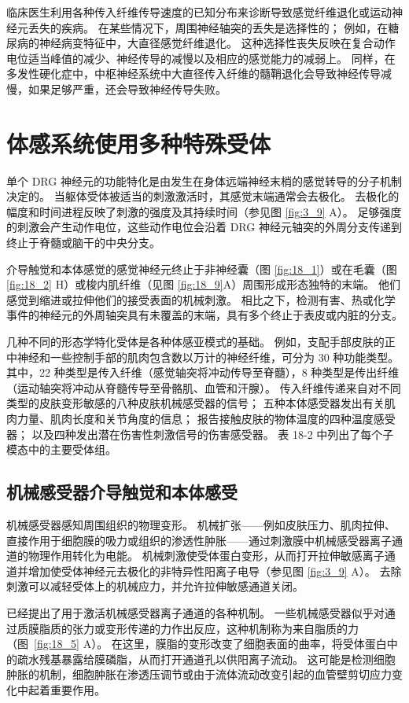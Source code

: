 临床医生利用各种传入纤维传导速度的已知分布来诊断导致感觉纤维退化或运动神经元丢失的疾病。 
在某些情况下，周围神经轴突的丢失是选择性的； 例如，在糖尿病的神经病变特征中，大直径感觉纤维退化。
这种选择性丧失反映在复合动作电位适当峰值的减少、神经传导的减慢以及相应的感觉能力的减弱上。 
同样，在多发性硬化症中，中枢神经系统中大直径传入纤维的髓鞘退化会导致神经传导减慢，如果足够严重，还会导致神经传导失败。


\section{体感系统使用多种特殊受体}
单个 DRG 神经元的功能特化是由发生在身体远端神经末梢的感觉转导的分子机制决定的。 
当躯体受体被适当的刺激激活时，其感觉末端通常会去极化。 
去极化的幅度和时间进程反映了刺激的强度及其持续时间（参见图 \ref{fig:3_9} A）。 
足够强度的刺激会产生动作电位，这些动作电位会沿着 DRG 神经元轴突的外周分支传递到终止于脊髓或脑干的中央分支。


介导触觉和本体感觉的感觉神经元终止于非神经囊（图 \ref{fig:18_1}）或在毛囊（图 \ref{fig:18_2} H）或梭内肌纤维（见图 \ref{fig:18_9}A）周围形成形态独特的末端。 
他们感觉到缩进或拉伸他们的接受表面的机械刺激。 
相比之下，检测有害、热或化学事件的神经元的外周轴突具有未覆盖的末端，具有多个终止于表皮或内脏的分支。


几种不同的形态学特化受体是各种体感亚模式的基础。 
例如，支配手部皮肤的正中神经和一些控制手部的肌肉包含数以万计的神经纤维，可分为 30 种功能类型。 其中，22 种类型是传入纤维（感觉轴突将冲动传导至脊髓），8 种类型是传出纤维（运动轴突将冲动从脊髓传导至骨骼肌、血管和汗腺）。 
传入纤维传递来自对不同类型的皮肤变形敏感的八种皮肤机械感受器的信号； 五种本体感受器发出有关肌肉力量、肌肉长度和关节角度的信息； 报告接触皮肤的物体温度的四种温度感受器； 以及四种发出潜在伤害性刺激信号的伤害感受器。 
表 18-2 中列出了每个子模态中的主要受体组。


\subsection{机械感受器介导触觉和本体感受}
机械感受器感知周围组织的物理变形。 
机械扩张——例如皮肤压力、肌肉拉伸、直接作用于细胞膜的吸力或组织的渗透性肿胀——通过刺激膜中机械感受器离子通道的物理作用转化为电能。 
机械刺激使受体蛋白变形，从而打开拉伸敏感离子通道并增加使受体神经元去极化的非特异性阳离子电导（参见图 \ref{fig:3_9} A）。 
去除刺激可以减轻受体上的机械应力，并允许拉伸敏感通道关闭。


已经提出了用于激活机械感受器离子通道的各种机制。 
一些机械感受器似乎对通过质膜脂质的张力或变形传递的力作出反应，这种机制称为来自脂质的力（图~\ref{fig:18_5} A）。 
在这里，膜脂的变形改变了细胞表面的曲率，将受体蛋白中的疏水残基暴露给膜磷脂，从而打开通道孔以供阳离子流动。 
这可能是检测细胞肿胀的机制，细胞肿胀在渗透压调节或由于流体流动改变引起的血管壁剪切应力变化中起着重要作用。

